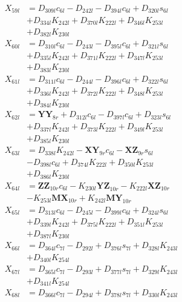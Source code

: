 \begin{multicols}{2}
\begin{align}
X_{59l} &= D_{309l}c_{6l} - D_{242l} - D_{394l}c_{6l} + D_{320l}s_{6l}  \nonumber \\
&+ D_{334l}K_{242l} + D_{370l}K_{222l} + D_{346l}K_{253l}  \nonumber \\
&+ D_{382l}K_{230l} \nonumber \\
X_{60l} &= D_{310l}c_{6l} - D_{243l} - D_{395l}c_{6l} + D_{321l}s_{6l}  \nonumber \\
&+ D_{335l}K_{242l} + D_{371l}K_{222l} + D_{347l}K_{253l}  \nonumber \\
&+ D_{383l}K_{230l} \nonumber \\
X_{61l} &= D_{311l}c_{6l} - D_{244l} - D_{396l}c_{6l} + D_{322l}s_{6l}  \nonumber \\
&+ D_{336l}K_{242l} + D_{372l}K_{222l} + D_{348l}K_{253l}  \nonumber \\
&+ D_{384l}K_{230l} \nonumber \\
X_{62l} &= \mathbf{YY}_{8r} + D_{312l}c_{6l} - D_{397l}c_{6l} + D_{323l}s_{6l}  \nonumber \\
&+ D_{337l}K_{242l} + D_{373l}K_{222l} + D_{349l}K_{253l}  \nonumber \\
&+ D_{385l}K_{230l} \nonumber \\
X_{63l} &= D_{338l}K_{242l} - \mathbf{XY}_{9r}c_{6l} - \mathbf{XZ}_{9r}s_{6l}  \nonumber \\
&- D_{398l}c_{6l} + D_{374l}K_{222l} + D_{350l}K_{253l}  \nonumber \\
&+ D_{386l}K_{230l} \nonumber \\
X_{64l} &= \mathbf{ZZ}_{10r}c_{6l} - K_{230l}\mathbf{YZ}_{10r} - K_{222l}\mathbf{XZ}_{10r}  \nonumber \\
&- K_{253l}\mathbf{MX}_{10r} + K_{242l}\mathbf{MY}_{10r} \nonumber \\
X_{65l} &= D_{313l}c_{6l} - D_{245l} - D_{399l}c_{6l} + D_{324l}s_{6l}  \nonumber \\
&+ D_{339l}K_{242l} + D_{375l}K_{222l} + D_{351l}K_{253l}  \nonumber \\
&+ D_{387l}K_{230l} \nonumber \\
X_{66l} &= D_{364l}c_{7l} - D_{292l} + D_{376l}s_{7l} + D_{328l}K_{243l}  \nonumber \\
&+ D_{340l}K_{254l} \nonumber \\
X_{67l} &= D_{365l}c_{7l} - D_{293l} + D_{377l}s_{7l} + D_{329l}K_{243l}  \nonumber \\
&+ D_{341l}K_{254l} \nonumber \\
X_{68l} &= D_{366l}c_{7l} - D_{294l} + D_{378l}s_{7l} + D_{330l}K_{243l}  \nonumber \\

\end{align}
\end{multicols}

